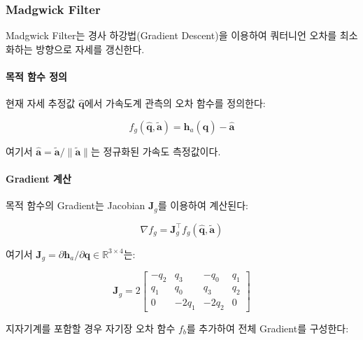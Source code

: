 \subsubsection{Madgwick Filter}

Madgwick Filter는 경사 하강법(Gradient Descent)을 이용하여
쿼터니언 오차를 최소화하는 방향으로 자세를 갱신한다.

\paragraph{목적 함수 정의}

현재 자세 추정값 $\hat{\mathbf{q}}$에서 가속도계 관측의 오차 함수를 정의한다:

\begin{equation}
    f_g(\hat{\mathbf{q}}, \tilde{\mathbf{a}}) = \mathbf{h}_a(\hat{\mathbf{q}}) - \hat{\mathbf{a}}
    \label{eq:madgwick_objective}
\end{equation}

\noindent 여기서 $\hat{\mathbf{a}} = \tilde{\mathbf{a}} / \|\tilde{\mathbf{a}}\|$는 정규화된 가속도 측정값이다.

\paragraph{Gradient 계산}

목적 함수의 Gradient는 Jacobian $\mathbf{J}_g$를 이용하여 계산된다:

\begin{equation}
    \nabla f_g = \mathbf{J}_g^\top f_g(\hat{\mathbf{q}}, \tilde{\mathbf{a}})
    \label{eq:madgwick_gradient}
\end{equation}

\noindent 여기서 $\mathbf{J}_g = \partial \mathbf{h}_a / \partial \mathbf{q} \in \mathbb{R}^{3\times 4}$는:

\begin{equation}
    \mathbf{J}_g = 2\begin{bmatrix}
        -q_2 &  q_3 & -q_0 &  q_1 \\
         q_1 &  q_0 &  q_3 &  q_2 \\
         0   & -2q_1 & -2q_2 & 0
    \end{bmatrix}
    \label{eq:madgwick_jacobian}
\end{equation}

지자기계를 포함할 경우 자기장 오차 함수 $f_b$를 추가하여
전체 Gradient를 구성한다:

